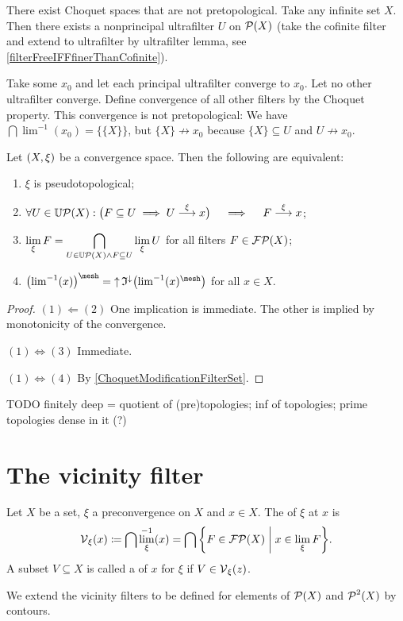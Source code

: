 \begin{example}
There exist Choquet spaces that are not pretopological. Take any infinite set $X$. Then there exists a nonprincipal ultrafilter $U$ on $\operatorname{\mathcal{P}}(X)$ (take the cofinite filter and extend to ultrafilter by ultrafilter lemma, see \ref{filterFreeIFFfinerThanCofinite}).

Take some $x_0$ and let each principal ultrafilter converge to $x_0$. Let no other ultrafilter converge. Define convergence of all other filters by the Choquet property. This convergence is not pretopological: We have $\bigcap \lim^{-1}(x_0) = \big\{\{X\}\big\}$, but $\{X\} \not\to x_0$ because $\{X\}\subseteq U$ and $U \not\to x_0$.
\end{example}

\begin{lemma} \label{pseudotopologicalConditions}
Let $\left( X, \xi \right)$ be a convergence space. Then the following are equivalent:
\begin{enumerate}
\item $\xi$ is pseudotopological;
\item $\forall U\in \operatorname{\mathbb{U}\mathcal{P}}(X): \big( F\subseteq U \implies U \overset{\xi}{\longrightarrow} x\big) \quad\implies\quad F \overset{\xi}{\longrightarrow} x$;
\item $\displaystyle\lim_\xi F = \bigcap_{U\in \operatorname{\mathbb{U}\mathcal{P}}(X)\land F \subseteq U}\lim_\xi U$ for all filters $F\in \operatorname{\mathcal{FP}}(X)$;
\item $\big({\lim}^{-1}(x)\big)^\mesh = \upset\mathfrak{I}^{\imf}\big({\lim}^{-1}(x)^\mesh\big)$ for all $x\in X$.
\end{enumerate}
\end{lemma}
\begin{proof}
$(1) \Leftarrow (2)$ One implication is immediate. The other is implied by monotonicity of the convergence.

$(1)\Leftrightarrow (3)$ Immediate.

$(1)\Leftrightarrow (4)$ By \ref{ChoquetModificationFilterSet}.
\end{proof}

TODO finitely deep = quotient of (pre)topologies; inf of topologies; prime topologies dense in it (?)



\section{The vicinity filter}
\begin{definition}
Let $X$ be a set, $\xi$ a preconvergence on $X$ and $x\in X$. The  of $\xi$ at $x$ is
\[ \vicinity_\xi(x) \defeq \bigcap \lim_\xi^{-1}(x) = \bigcap \setbuilder{F\in \powerfilters(X)}{x\in \lim_\xi F}. \]
A subset $V\subseteq X$ is called a  of $x$ for $\xi$ if $V\in \operatorname{\mathcal{V}}_\xi(z)$.

We extend the vicinity filters to be defined for elements of $\operatorname{\mathcal{P}}(X)$ and $\operatorname{\mathcal{P}}^2(X)$ by contours.
\end{definition}

